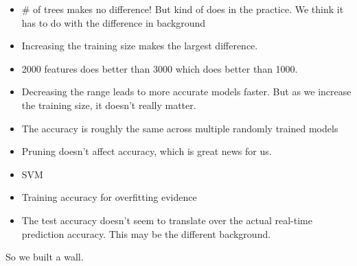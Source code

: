 \begin{itemize}
	\item \# of trees makes no difference! But kind of does in the practice. We think it has to do with the difference in background
	\item Increasing the training size makes the largest difference.
	\item 2000 features does better than 3000 which does better than 1000.
	\item Decreasing the range leads to more accurate models faster. But as we increase the training size, it doesn't really matter.
	\item The accuracy is roughly the same across multiple randomly trained models
	\item Pruning doesn't affect accuracy, which is great news for us.
	\item SVM
	\item Training accuracy for overfitting evidence
	\item The test accuracy doesn't seem to translate over the actual real-time prediction accuracy. This may be the different background.
\end{itemize}

So we built a wall.